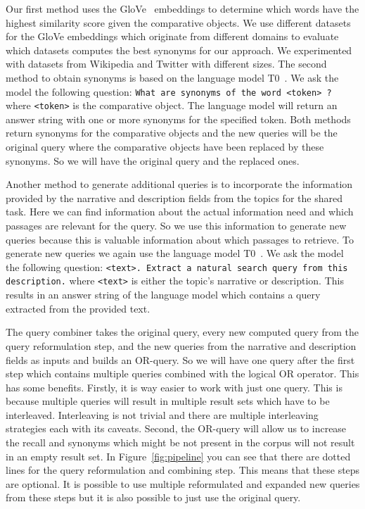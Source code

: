 Our first method uses the GloVe~\cite{PenningtonSM2014} embeddings to determine which words have the highest similarity score given the comparative objects.
We use different datasets for the GloVe embeddings which originate from different domains to evaluate which datasets computes the best synonyms for our approach.
We experimented with datasets from Wikipedia and Twitter with different sizes.
The second method to obtain synonyms is based on the language model T0~\cite{SanhWRBSACSLRDBXTSSKCNDCJWMSYPBWNRSSFFTBGBWR2021}.
We ask the model the following question: \texttt{What are synonyms of the word <token> ?} where \texttt{<token>} is the comparative object.
The language model will return an answer string with one or more synonyms for the specified token.
Both methods return synonyms for the comparative objects and the new queries will be the original query where the comparative objects have been replaced by these synonyms.
So we will have the original query and the replaced ones.

Another method to generate additional queries is to incorporate the information provided by the narrative and description fields from the topics for the shared task.
Here we can find information about the actual information need and which passages are relevant for the query. So we use this information to generate new queries because this is valuable information about which passages to retrieve.
To generate new queries we again use the language model T0~\cite{SanhWRBSACSLRDBXTSSKCNDCJWMSYPBWNRSSFFTBGBWR2021}.
We ask the model the following question: \texttt{<text>. Extract a natural search query from this description.} where \texttt{<text>} is either the topic's narrative or description.
This results in an answer string of the language model which contains a query extracted from the provided text. 

The query combiner takes the original query, every new computed query from the query reformulation step, and the new queries from the narrative and description fields as inputs and builds an OR-query.
So we will have one query after the first step which contains multiple queries combined with the logical OR operator.
This has some benefits.
Firstly, it is way easier to work with just one query.
This is because multiple queries will result in multiple result sets which have to be interleaved.
Interleaving is not trivial and there are multiple interleaving strategies each with its caveats.
Second, the OR-query will allow us to increase the recall and synonyms which might be not present in the corpus will not result in an empty result set.
In Figure~\ref{fig:pipeline} you can see that there are dotted lines for the query reformulation and combining step.
This means that these steps are optional.
It is possible to use multiple reformulated and expanded new queries from these steps but it is also possible to just use the original query.

